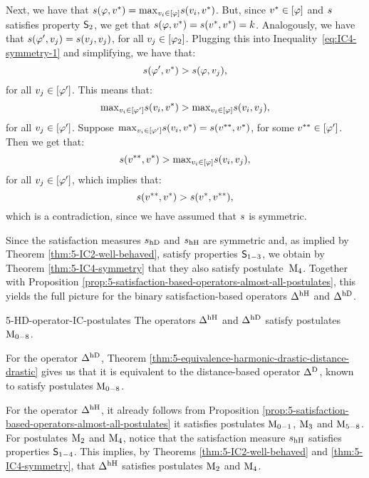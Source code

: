 \begin{prf*}{}{}
	Next, we have that $s(\varphi,v^\ast)={\operatorname{max}}_{v_i\in[\varphi]}s(v_i,v^\ast)$. But,
	since $v^\ast\in[\varphi]$ and $s$ satisfies property $\mathsf{S}_{2}$, we get that
	$s(\varphi,v^\ast)=s(v^\ast,v^\ast)=k$.
	Analogously, we have that $s(\varphi',v_j)=s(v_j,v_j)$, for all $v_j\in[\varphi_2]$.
	Plugging this into Inequality~\ref{eq:IC4-symmetry-1} and simplifying, we have that:
	$$
		s(\varphi',v^\ast)>s(\varphi,v_j),		
	$$
	for all $v_j\in[\varphi']$. This means	 that:
	$$
		{\operatorname{max}}_{v_i\in[\varphi']}s(v_i,v^\ast)>{\operatorname{max}}_{v_i\in[\varphi]}s(v_i,v_j),
	$$
	for all $v_j\in[\varphi']$.
	Suppose ${\operatorname{max}}_{v_i\in[\varphi']}s(v_i,v^\ast)=s(v^{\ast\ast},v^\ast)$, for some $v^{\ast\ast}\in[\varphi']$. Then we get that:
	$$
	s(v^{\ast\ast},v^\ast)>{\operatorname{max}}_{v_i\in[\varphi]}s(v_i,v_j),
	$$
	for all $v_j\in[\varphi']$, which implies that:
	$$
		s(v^{\ast\ast},v^\ast)>s(v^\ast,v^{\ast\ast}),
	$$
	which is a contradiction, since we have assumed that $s$ is symmetric.	
\end{prf*}

Since the satisfaction measures $s_{\mathrm{hD}}$ and $s_{\mathrm{hH}}$ are symmetric
and, as implied by Theorem \ref{thm:5-IC2-well-behaved}, satisfy properties $\mathsf{S}_{1-3}$,
we obtain by Theorem \ref{thm:5-IC4-symmetry} that they also satisfy postulate~$\mathrm{M}_{4}$.
Together with Proposition \ref{prop:5-satisfaction-based-operators-almost-all-postulates},
this yields the full picture for the binary satisfaction-based operators $\Delta^{\mathrm{hH}}{}$ and $\Delta^{\mathrm{hD}}$.

\begin{prp}{}{5-HD-operator-IC-postulates}
	The operators $\Delta^{\mathrm{hH}}{}$ and $\Delta^{\mathrm{hD}}$ satisfy postulates $\mathrm{M}_{0-8}$.
\end{prp}
\begin{prf*}{}{}%
	For the operator $\Delta^{\mathrm{hD}}$, 
	Theorem \ref{thm:5-equivalence-harmonic-drastic-distance-drastic}
	gives us that it is equivalent to the distance-based operator $\Delta^{{\operatorname{D}}}$, known to satisfy
	postulates $\mathrm{M}_{0-8}$.
	
	For the operator $\Delta^{\mathrm{hH}}$, 
	it already follows from Proposition \ref{prop:5-satisfaction-based-operators-almost-all-postulates}
	it satisfies postulates $\mathrm{M}_{0-1}$, $\mathrm{M}_{3}$ and $\mathrm{M}_{5-8}$.
	For postulates $\mathrm{M}_{2}$ and $\mathrm{M}_{4}$, notice that the satisfaction measure $s_{\mathrm{hH}}$
	satisfies properties $\mathsf{S}_{1-4}$.
	This implies, by Theorems \ref{thm:5-IC2-well-behaved} and \ref{thm:5-IC4-symmetry},
	that $\Delta^{\mathrm{hH}}$ satisfies postulates $\mathrm{M}_{2}$ and $\mathrm{M}_{4}$.
\end{prf*}

